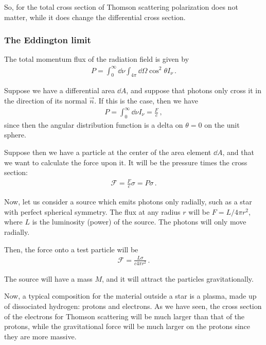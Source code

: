 \documentclass[main.tex]{subfiles}
\begin{document}
So, for the total cross section of Thomson scattering polarization does not matter, while it does change the differential cross section. 

\subsubsection{The Eddington limit}

The total momentum flux of the radiation field is given by 
%
\begin{align}
P = \int_{0}^{\infty } \dd{\nu } \int_{4 \pi } \dd{\Omega } \cos^2 \theta I_\nu 
\,.
\end{align}

Suppose we have a differential area \(\dd{A}\), and suppose that photons only cross it in the direction of its normal \(\vec{n}\). 
If this is the case, then we have 
%
\begin{align}
P = \int_0^{\infty } \dd{\nu } I_\nu  = \frac{F}{c}
\,,
\end{align}
%
since then the angular distribution function is a delta on \(\theta = 0 \) on the unit sphere. 

Suppose then we have a particle at the center of the area element \(\dd{A}\), and that we want to calculate the force upon it. It will be the pressure times the cross section: 
%
\begin{align}
\mathscr{F} = \frac{F}{c} \sigma = P \sigma 
\,.
\end{align}

Now, let us consider a source which emits photons only radially, such as a star with perfect spherical symmetry. 
The flux at any radius \(r\) will be \(F = L / 4 \pi r^2\), where \(L\) is the luminosity (power) of the source. 
The photons will only move radially. 

Then, the force onto a test particle will be 
%
\begin{align}
\mathscr{F} = \frac{L \sigma }{c 4 \pi r^2}
\,.
\end{align}

The source will have a mass \(M\), and it will attract the particles gravitationally.

Now, a typical composition for the material outside a star is a plasma, made up of dissociated hydrogen: protons and electrons.
As we have seen, the cross section of the electrons for Thomson scattering will be much larger than that of the protons, while the gravitational force will be much larger on the protons since they are more massive. 
\end{document}
